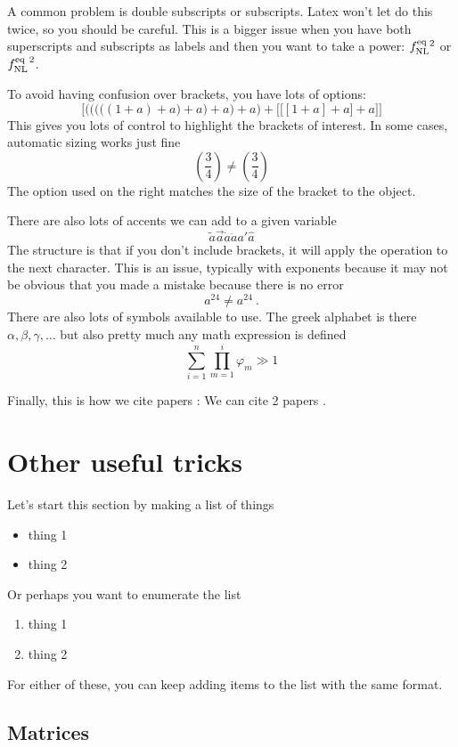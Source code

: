 \documentclass[11pt]{article}
\numberwithin{equation}{section}
\def\beq{\begin{equation}}
\def\eeq{\end{equation}}
\begin{document}
A common problem is double subscripts or subscripts.  Latex won't let do this twice, so you should be careful.  This is a bigger issue when you have both superscripts and subscripts as labels and then you want to take a power: $f_{\rm NL}^{\rm eq}{}^2$ or $f_{\rm NL}^{{\rm eq} \ 2}$.

To avoid having confusion over brackets, you have lots of options:
\beq
\Bigg[\Bigg(\bigg(\Big(\big((1+a)+a\big)+a\Big)+a\bigg)+a\Bigg)+\Big[\big[[1+a]+a\big]+a\Big]\Bigg]
\eeq
This gives you lots of control to highlight the brackets of interest.  In some cases, automatic sizing works just fine
\beq
(\frac{3}{4}) \neq \left( \frac{3}{4}\right)
\eeq
The option used on the right matches the size of the bracket to the object.

There are also lots of accents we can add to a given variable
\beq
\tilde a \vec a \dot a \ddot a a' \hat a
\eeq
The structure is that if you don't include brackets, it will apply the operation to the next character.  This is an issue, typically with exponents because it may not be obvious that you made a mistake because there is no error
\beq
a^{24} \neq a^24 \ .
\eeq
There are also lots of symbols available to use.  The greek alphabet is there $\alpha, \beta, \gamma, \ldots $ but also pretty much any math expression is defined
\beq
\sum_{i=1}^{n} \prod_{m=1}^{i} \varphi_{m} \gg 1
\eeq

Finally, this is how we cite papers : We can cite 2 papers \cite{Maldacena:2002vr,Ade:2013ydc}.


\section{Other useful tricks}

Let's start this section by making a list of things
\begin{itemize}
\item thing 1
\item thing 2
\end{itemize}
Or perhaps you want to enumerate the list
\begin{enumerate}
\item thing 1
\item thing 2
\end{enumerate}
For either of these, you can keep adding items to the list with the same format.

\subsection{Matrices}
\end{document}
